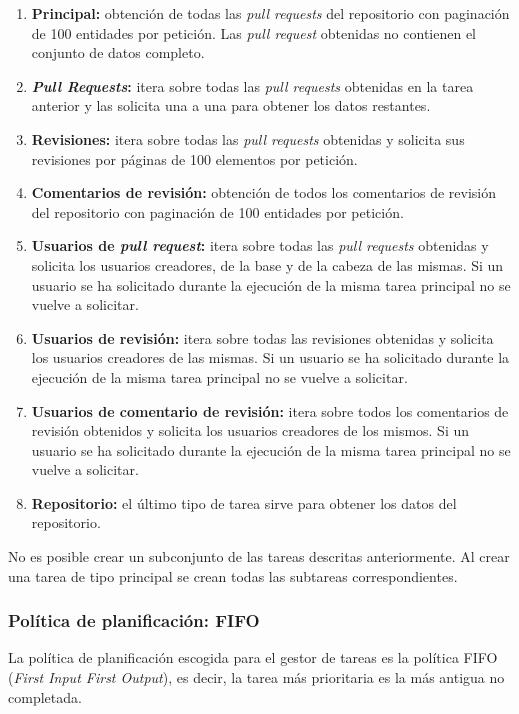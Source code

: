 \begin{enumerate}
\tightlist
	\item \textbf{Principal:} obtención de todas las \emph{pull requests} del repositorio con paginación de 100 entidades por petición. Las \emph{pull request} obtenidas no contienen el conjunto de datos completo.
	\item \textbf{\emph{Pull Requests}:} itera sobre todas las \emph{pull requests} obtenidas en la tarea anterior y las solicita una a una para obtener los datos restantes.
	\item \textbf{Revisiones:} itera sobre todas las \emph{pull requests} obtenidas y solicita sus revisiones por páginas de 100 elementos por petición.
	\item \textbf{Comentarios de revisión:} obtención de todos los comentarios de revisión del repositorio con paginación de 100 entidades por petición.
	\item \textbf{Usuarios de \emph{pull request}:} itera sobre todas las \emph{pull requests} obtenidas y solicita los usuarios creadores, de la base y de la cabeza de las mismas. Si un usuario se ha solicitado durante la ejecución de la misma tarea principal no se vuelve a solicitar.
	\item \textbf{Usuarios de revisión:} itera sobre todas las revisiones obtenidas y solicita los usuarios creadores de las mismas. Si un usuario se ha solicitado durante la ejecución de la misma tarea principal no se vuelve a solicitar.
	\item \textbf{Usuarios de comentario de revisión:} itera sobre todos los comentarios de revisión obtenidos y solicita los usuarios creadores de los mismos. Si un usuario se ha solicitado durante la ejecución de la misma tarea principal no se vuelve a solicitar.
	\item \textbf{Repositorio:} el último tipo de tarea sirve para obtener los datos del repositorio.
\end{enumerate}

No es posible crear un subconjunto de las tareas descritas anteriormente. Al crear una tarea de tipo principal se crean todas las subtareas correspondientes.

\subsubsection{Política de planificación: FIFO}

La política de planificación escogida para el gestor de tareas es la política FIFO (\emph{First Input First Output}), es decir, la tarea más prioritaria es la más antigua no completada.

